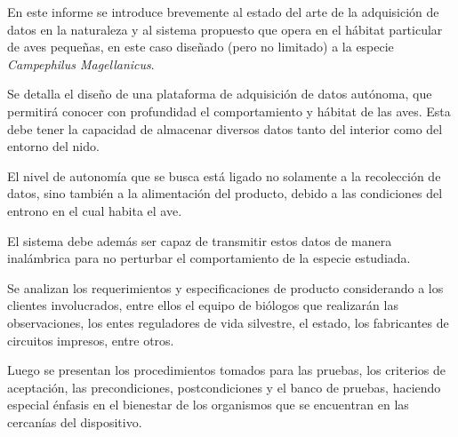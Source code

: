 %

%

En este informe se introduce brevemente al estado del arte de la adquisición de datos en la naturaleza y al sistema propuesto que opera en el hábitat particular de aves pequeñas, en este caso diseñado (pero no limitado) a la especie \textit{Campephilus Magellanicus}. 

Se detalla el diseño de una plataforma de adquisición de datos autónoma, que permitirá conocer con profundidad el comportamiento y hábitat de las aves. Esta debe tener la capacidad de almacenar diversos datos tanto del interior como del entorno del nido.%

El nivel de autonomía que se busca está ligado no solamente a la recolección de datos, sino también a la alimentación del producto, debido a las condiciones del entrono en el cual habita el ave. 

El sistema debe además ser capaz de transmitir estos datos de manera inalámbrica para no perturbar el comportamiento de la especie estudiada.

Se analizan los requerimientos y especificaciones de producto considerando a los clientes involucrados, entre ellos el equipo de biólogos que realizarán las observaciones, los entes reguladores de vida silvestre, el estado, los fabricantes de circuitos impresos, entre otros.

Luego se presentan los procedimientos tomados para las pruebas, los criterios de aceptación, las precondiciones, postcondiciones y el banco de pruebas, haciendo especial énfasis en el bienestar de los organismos que se encuentran en las cercanías del dispositivo.

\TBC


%
